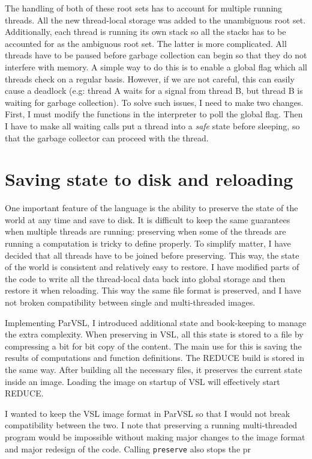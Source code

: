 The handling of both of these root sets has to account for multiple running threads. All the new
thread-local storage was added to the unambiguous root set. Additionally, each thread is running its
own stack so all the stacks has to be accounted for as the ambiguous root set. The latter is more complicated.
All threads have to be paused before garbage collection can begin so that they do not interfere
with memory. A simple way to do this is to enable a global flag which all threads check on a regular basis.
However, if we are not careful, this can easily cause a deadlock (e.g: thread A waits for a signal from
thread B, but thread B is waiting for garbage collection). To solve such issues, I need to make two
changes. First, I must modify the functions in the interpreter to poll the global flag. Then I have
to make all waiting calls put a thread into a \emph{safe} state before sleeping, so that the garbage collector
can proceed with the thread.

\section{Saving state to disk and reloading}
\label{sec:preserve}

One important feature of the language is the ability to preserve the state of the world at any
time and save to disk. It is difficult to keep the same guarantees when multiple threads are running:
preserving when some of the threads are running a computation is tricky to define properly. To simplify
matter, I have decided that all threads have to be joined before preserving. This way, the state of
the world is consistent and relatively easy to restore. I have modified parts of the code to write
all the thread-local data back into global storage and then restore it when reloading. This way the same
file format is preserved, and I have not broken compatibility between single and multi-threaded images.

Implementing ParVSL, I introduced additional state and book-keeping to manage the extra complexity.
When preserving in VSL, all this state is stored to a file by compressing a bit for bit copy of the
content. The main use for this is saving the results of computations and function definitions.
The REDUCE build is stored in the same way. After building all the necessary files,
it preserves the current state inside an image. Loading the image on startup of VSL will effectively
start REDUCE.

I wanted to keep the VSL image format in ParVSL so that I would not break compatibility between the two.
I note that preserving a running multi-threaded program would be impossible without making major changes
to the image format and major redesign of the code. Calling \texttt{preserve} also stops the pr

